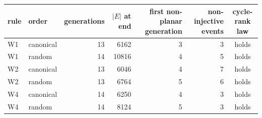 \begin{tabular}{llrrrrc}
\toprule
rule & order & generations & $|E|$ at end & first non-planar generation & non-injective events & cycle-rank law\\
\midrule
W1 & canonical & 13 & 6162 & 3 & 3 & holds\\
W1 & random & 14 & 10816 & 4 & 5 & holds\\
W2 & canonical & 13 & 6046 & 4 & 7 & holds\\
W2 & random & 13 & 6764 & 5 & 6 & holds\\
W4 & canonical & 14 & 6250 & 4 & 3 & holds\\
W4 & random & 14 & 8124 & 5 & 3 & holds\\
\bottomrule
\end{tabular}

